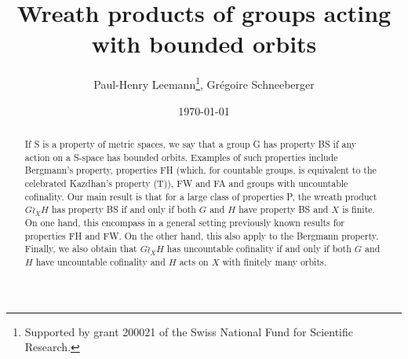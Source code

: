 \documentclass[a4paper]{article}
\title{Wreath products of groups acting with bounded orbits}
\author{Paul-Henry Leemann\thanks{Supported by grant 200021\textunderscore188578 of the Swiss National Fund for Scientific Research.}, Grégoire Schneeberger}
\date{\today \quad \currenttime}
\theoremstyle{definition}
\theoremstyle{remark}%
\begin{document}
\maketitle
%
%
%
%
%
%
%
%
%
%
\begin{abstract}
If S is a property of metric spaces, we say that a group G has property BS if any action on a S-space has bounded orbits. Examples of such properties include Bergmann's property, properties FH (which, for countable groups, is equivalent to the celebrated Kazdhan's property (T)), FW and FA and groups with uncountable cofinality.
Our main result is that for a large class of properties P, the wreath product $G\wr_XH$ has property BS if and only if both $G$ and $H$ have property BS and $X$ is finite. On one hand, this encompass in a general setting previously known results for properties FH and FW. On the other hand, this also apply to the Bergmann property.
Finally, we also obtain that $G\wr_XH$ has uncountable cofinality if and only if both $G$ and $H$ have uncountable cofinality and $H$ acts on $X$ with finitely many orbits.
\end{abstract}
%
%
%
%
%
%
%
%
%
%
%
%
%
%
%
%
%
%
%
%
%
%
%
%
%
\end{document}

